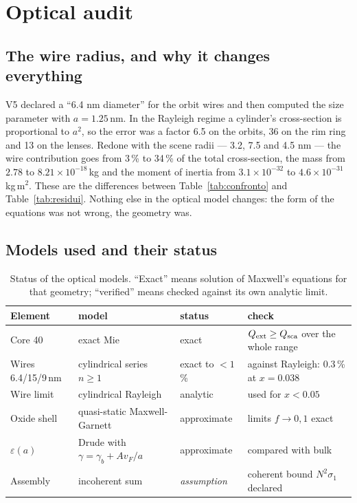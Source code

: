 \documentclass[11pt,a4paper]{article}
\providecommand{\toprule}{\hline}
\providecommand{\midrule}{\hline}
\providecommand{\bottomrule}{\hline}
\providecommand{\SI}[2]{#1\,\text{#2}}
\begin{document}
\section{Optical audit}
\label{sec:ottica}

\subsection{The wire radius, and why it changes everything}

V5 declared a ``6.4 nm diameter'' for the orbit wires and then computed the size
parameter with $a=\SI{1.25}{nm}$. In the Rayleigh regime a cylinder's cross-section is
proportional to $a^2$, so the error was a factor 6.5 on the orbits, 36 on the rim ring
and 13 on the lenses. Redone with the scene radii --- 3.2, 7.5 and 4.5 nm --- the wire
contribution goes from 3\,\% to 34\,\% of the total cross-section, the mass from
$2.78$ to $8.21\times10^{-18}$\,kg and the moment of inertia from $3.1\times10^{-32}$
to $4.6\times10^{-31}$\,kg\,m$^2$. These are the differences between
Table~\ref{tab:confronto} and Table~\ref{tab:residui}. Nothing else in the optical
model changes: the form of the equations was not wrong, the geometry was.

\subsection{Models used and their status}

\begin{table}[H]
\centering\small
\caption{Status of the optical models. ``Exact'' means solution of Maxwell's equations
for that geometry; ``verified'' means checked against its own analytic limit.}
\label{tab:ottica}
\begin{tabular}{p{3.4cm}p{3.0cm}p{2.8cm}p{4.6cm}}
\toprule
Element & model & status & check \\
\midrule
Core \SI{40}{nm} & exact Mie & exact & $Q_{\rm ext}\ge Q_{\rm sca}$ over the whole range \\
Wires 6.4/15/9\,nm & cylindrical series $n\ge1$ & exact to $<1$\,\% & against Rayleigh: $0.3$\,\% at $x=0.038$ \\
Wire limit & cylindrical Rayleigh & analytic & used for $x<0.05$ \\
Oxide shell & quasi-static Maxwell-Garnett & approximate & limits $f\to0,1$ exact \\
$\varepsilon(a)$ & Drude with $\gamma=\gamma_b+Av_F/a$ & approximate & compared with bulk \\
Assembly & incoherent sum & \emph{assumption} & coherent bound $N^2\sigma_1$ declared \\
\bottomrule
\end{tabular}
\end{table}
\end{document}
